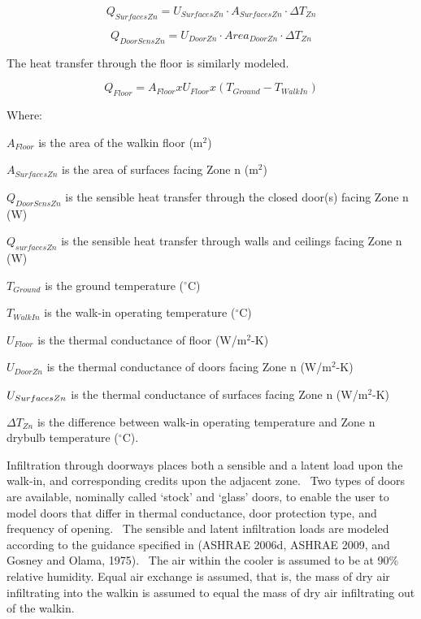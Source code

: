 \begin{equation}
Q_{SurfacesZn} = U_{SurfacesZn} \cdot A_{SurfacesZn} \cdot \Delta T_{Zn}
\end{equation}

\begin{equation}
Q_{DoorSensZn} = U_{DoorZn} \cdot Area_{DoorZn} \cdot \Delta T_{Zn}
\end{equation}

The heat transfer through the floor is similarly modeled.

\begin{equation}
Q_{Floor} = A_{Floor} x U_{Floor} x (T_{Ground} - T_{WalkIn})
\end{equation}

Where:

\(A_{Floor}\) is the area of the walkin floor (m\(^{2}\))

\(A_{SurfacesZn}\) is the area of surfaces facing Zone n (m\(^{2}\))

\(Q_{DoorSensZn}\) is the sensible heat transfer through the closed door(s) facing Zone n (W)

\(Q_{surfacesZn}\) is the sensible heat transfer through walls and ceilings facing Zone n (W)

\(T_{Ground}\) is the ground temperature (\(^{\circ}\)C)

\(T_{WalkIn}\) is the walk-in operating temperature (\(^{\circ}\)C)

\(U_{Floor}\) is the thermal conductance of floor (W/m\(^{2}\)-K)

\(U_{DoorZn}\) is the thermal conductance of doors facing Zone n (W/m\(^{2}\)-K)

\(U_{SurfacesZn\\}\) is the thermal conductance of surfaces facing Zone n (W/m\(^{2}\)-K)

\(\Delta T_{Zn}\) is the difference between walk-in operating temperature and Zone n drybulb temperature (\(^{\circ}\)C).

Infiltration through doorways places both a sensible and a latent load upon the walk-in, and corresponding credits upon the adjacent zone.~ Two types of doors are available, nominally called `stock' and `glass' doors, to enable the user to model doors that differ in thermal conductance, door protection type, and frequency of opening.~ The sensible and latent infiltration loads are modeled according to the guidance specified in (ASHRAE 2006d, ASHRAE 2009, and Gosney and Olama, 1975).~ The air within the cooler is assumed to be at 90\% relative humidity. Equal air exchange is assumed, that is, the mass of dry air infiltrating into the walkin is assumed to equal the mass of dry air infiltrating out of the walkin.

